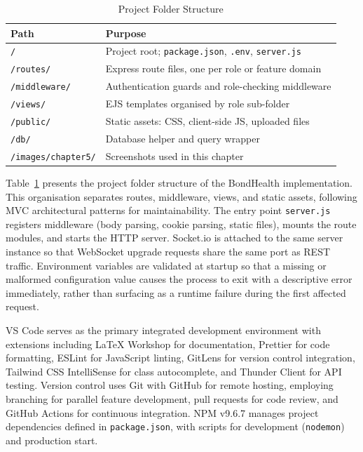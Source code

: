 \vspace{1em}
\begin{table}[H]
\centering
\caption{Project Folder Structure}     %
\label{tab:folder-structure}     
\begin{tabular}{ll}
\hline
\textbf{Path} & \textbf{Purpose} \\
\hline
\texttt{/} & Project root; \texttt{package.json}, \texttt{.env}, \texttt{server.js} \\
\texttt{/routes/} & Express route files, one per role or feature domain \\
\texttt{/middleware/} & Authentication guards and role-checking middleware \\
\texttt{/views/} & EJS templates organised by role sub-folder \\
\texttt{/public/} & Static assets: CSS, client-side JS, uploaded files \\
\texttt{/db/} & Database helper and query wrapper \\
\texttt{/images/chapter5/} & Screenshots used in this chapter \\
\hline
\end{tabular}
\end{table}
\noindent Table~\ref{tab:folder-structure} presents the project folder structure of the BondHealth implementation. This organisation separates routes, middleware, views, and static assets, following MVC architectural patterns for maintainability.
\justifying
\noindent The entry point \texttt{server.js} registers middleware (body parsing, cookie parsing, static files), mounts the route modules, and starts the HTTP server. Socket.io is attached to the same server instance so that WebSocket upgrade requests share the same port as REST traffic. Environment variables are validated at startup so that a missing or malformed configuration value causes the process to exit with a descriptive error immediately, rather than surfacing as a runtime failure during the first affected request.

\justifying
\noindent VS Code serves as the primary integrated development environment with extensions including LaTeX Workshop for documentation, Prettier for code formatting, ESLint for JavaScript linting, GitLens for version control integration, Tailwind CSS IntelliSense for class autocomplete, and Thunder Client for API testing. Version control uses Git with GitHub for remote hosting, employing branching for parallel feature development, pull requests for code review, and GitHub Actions for continuous integration. NPM v9.6.7 manages project dependencies defined in \texttt{package.json}, with scripts for development (\texttt{nodemon}) and production start.

